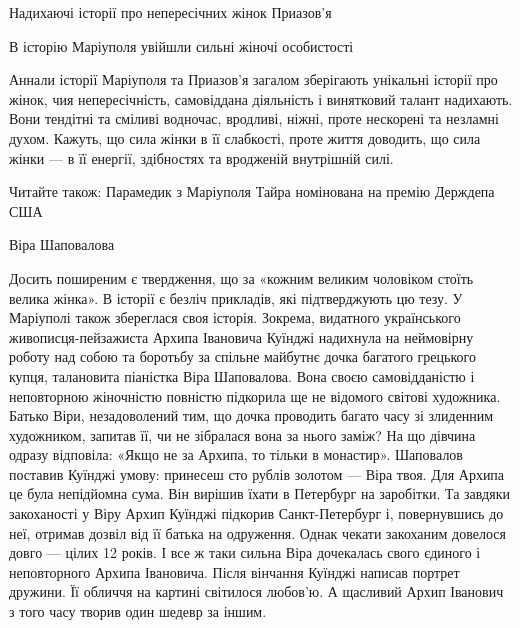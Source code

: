  
 
 
 
 

Надихаючі історії про непересічних жінок Приазов'я

В історію Маріуполя увійшли сильні жіночі особистості

Аннали історії Маріуполя та Приазов'я загалом зберігають унікальні історії про
жінок, чия непересічність, самовіддана діяльність і винятковий талант
надихають. Вони тендітні та сміливі водночас, вродливі, ніжні, проте нескорені
та незламні духом. Кажуть, що сила жінки в її слабкості, проте життя доводить,
що сила жінки — в її енергії, здібностях та вродженій внутрішній силі.

Читайте також: Парамедик з Маріуполя Тайра номінована на премію Держдепа США

Віра Шаповалова

Досить поширеним є твердження, що за «кожним великим чоловіком стоїть велика
жінка». В історії є безліч прикладів, які підтверджують цю тезу. У Маріуполі
також збереглася своя історія. Зокрема, видатного українського
живописця-пейзажиста Архипа Івановича Куїнджі надихнула на неймовірну роботу
над собою та боротьбу за спільне майбутнє дочка багатого грецького купця,
талановита піаністка Віра Шаповалова. Вона своєю самовідданістю і неповторною
жіночністю повністю підкорила ще не відомого світові художника. Батько Віри,
незадоволений тим, що дочка проводить багато часу зі злиденним художником,
запитав її, чи не зібралася вона за нього заміж? На що дівчина одразу
відповіла: «Якщо не за Архипа, то тільки в монастир». Шаповалов поставив
Куїнджі умову: принесеш сто рублів золотом — Віра твоя. Для Архипа це була
непідйомна сума. Він вирішив їхати в Петербург на заробітки. Та завдяки
закоханості у Віру Архип Куїнджі підкорив Санкт-Петербург і, повернувшись до
неї, отримав дозвіл від її батька на одруження. Однак чекати закоханим довелося
довго — цілих 12 років. І все ж таки сильна Віра дочекалась свого єдиного і
неповторного Архипа Івановича. Після вінчання Куїнджі написав портрет дружини.
Її обличчя на картині світилося любов'ю. А щасливий Архип Іванович з того часу
творив один шедевр за іншим.

